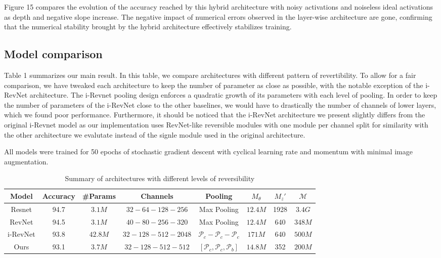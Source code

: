 \documentclass[twocolumn]{bmcart}
\begin{document}
Figure 15 compares the evolution of the accuracy reached by this hybrid architecture with noisy activations and noiseless ideal activations as depth and negative slope increase.
The negative impact of numerical errors observed in the layer-wise architecture are gone,
confirming that the numerical stability brought by the hybrid architecture effectively stabilizes training.


\subsection{Model comparison}

Table 1 summarizes our main result.
In this table, we compare architectures with different pattern of revertibility.
To allow for a fair comparison, we have tweaked each architecture to keep the number of parameter as close as possible,
with the notable exception of the i-RevNet architecture. 
The i-Revnet pooling design enforces a quadratic growth of its parameters with each level of pooling.
In order to keep the number of parameters of the i-RevNet close to the other baselines, we would have to drastically 
the number of channels of lower layers, which we found poor performance. 
Furthermore, it should be noticed that the i-RevNet architecture we present slightly differs from the original i-Revnet model
as our implementation uses RevNet-like reversible modules with one module per channel split for similarity with
the other architecture we evalutate instead of the signle module used in the original architecture.

All models were trained for 50 epochs of stochastic gradient descent with cyclical learning rate and momentum \cite{smith2017super} with minimal image augmentation.

\begin{table*}[t]
\begin{tabular}{ c c c c c c c c}	
Model     & Accuracy & #Params & Channels & Pooling  & $M_{\theta}$ & $M_{z}'$ & $\mathcal{M} $ \\
\hline
Resnet    & 94.7   & $3.1M$   &  $32 - 64 - 128  - 256$       & Max Pooling      				         &  $12.4M$   &  1928  & $3.4G$  \\			
RevNet    & 94.5   & $3.1M$   &  $40 - 80 - 256  - 320$       & Max Pooling      				         &  $12.4M$   &  640   & $348M$  \\
i-RevNet  & 93.8   & $42.8M$  &  $32 - 128 - 512 - 2048$      & $\mathcal{P}_c - \mathcal{P}_c - \mathcal{P}_c$          &  $171M$    &  640   & $500M$  \\
Ours      & 93.1   & $3.7M$   &  $32 - 128 - 512 - 512$       & $[\mathcal{P}_c, \mathcal{P}_c, \mathcal{P}_b]$          &  $14.8M$   &  352   & $200M$  \\
\hline
\end{tabular}
\caption{Summary of architectures with different levels of reversibility}
\end{table*}
\end{document}
